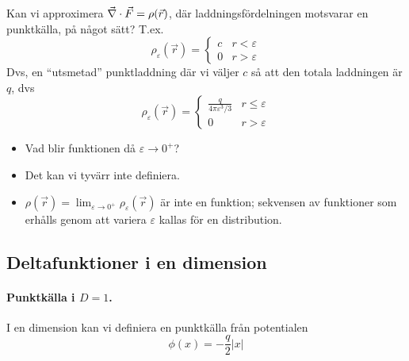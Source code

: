 \documentclass[%
oneside,                 %
final,                   %
10pt]{article}
\begin{document}
Kan vi approximera $\vec{\nabla} \cdot \vec{F} = \rho (\vec{r})$, där laddningsfördelningen motsvarar en punktkälla, på något sätt? T.ex.
\begin{equation}
\rho_\varepsilon (\vec{r}) = \left\{
\begin{array}{ll}
c & r < \varepsilon \\ 
0 & r > \varepsilon
\end{array}
\right.
\end{equation}
Dvs, en ``utsmetad'' punktladdning där vi väljer $c$ så att den totala laddningen är $q$, dvs
\begin{equation}
\rho_\varepsilon (\vec{r}) = \left\{
\begin{array}{ll}
\frac{q}{4\pi\varepsilon^3/3} & r \le \varepsilon \\ 
0 & r > \varepsilon
\end{array}
\right.
\end{equation}
\begin{itemize}
\item Vad blir funktionen då $\varepsilon \to 0^+$? 

\item Det kan vi tyvärr inte definiera.

\item $\rho(\vec{r}) = \lim_{\varepsilon \to 0^+} \rho_\varepsilon(\vec{r})$ är inte en funktion; sekvensen av funktioner som erhålls genom att variera $\varepsilon$ kallas för en distribution.
\end{itemize}

\noindent
\subsection*{Deltafunktioner i en dimension}

\paragraph{Punktkälla i $D=1$.}
I en dimension kan vi definiera en punktkälla från potentialen
\begin{equation}
\phi(x) = -\frac{q}{2} \left| x \right|
\end{equation}



\vspace{6mm}
\end{document}
